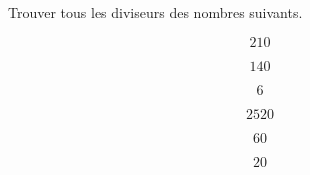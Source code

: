 Trouver tous les diviseurs des nombres suivants.
\begin{multicols}{3}
$$210$$

$$140$$
\columnbreak

$$6$$

$$2520$$
\columnbreak

$$60$$

$$20$$
\columnbreak

\end{multicols}